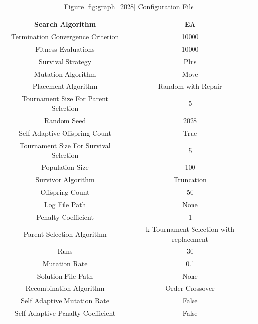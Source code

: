 \documentclass{standalone}
\begin{document}
\begin{table}[!htb]
	\centering
	\caption{Figure \ref{fig:graph_2028} Configuration File}
	\label{tab:graph_2028}
	\begin{tabular}{| c | c |}
		\hline
		Search Algorithm		& EA		 \\
		\hline
		Termination Convergence Criterion		& 10000		 \\
		\hline
		Fitness Evaluations		& 10000		 \\
		\hline
		Survival Strategy		& Plus		 \\
		\hline
		Mutation Algorithm		& Move		 \\
		\hline
		Placement Algorithm		& Random with Repair		 \\
		\hline
		Tournament Size For Parent Selection		& 5		 \\
		\hline
		Random Seed		& 2028		 \\
		\hline
		Self Adaptive Offspring Count		& True		 \\
		\hline
		Tournament Size For Survival Selection		& 5		 \\
		\hline
		Population Size		& 100		 \\
		\hline
		Survivor Algorithm		& Truncation		 \\
		\hline
		Offspring Count		& 50		 \\
		\hline
		Log File Path		& None		 \\
		\hline
		Penalty Coefficient		& 1		 \\
		\hline
		Parent Selection Algorithm		& k-Tournament Selection with replacement		 \\
		\hline
		Runs		& 30		 \\
		\hline
		Mutation Rate		& 0.1		 \\
		\hline
		Solution File Path		& None		 \\
		\hline
		Recombination Algorithm		& Order Crossover		 \\
		\hline
		Self Adaptive Mutation Rate		& False		 \\
		\hline
		Self Adaptive Penalty Coefficient		& False		 \\
		\hline
	\end{tabular}
\end{table}
\end{document}
